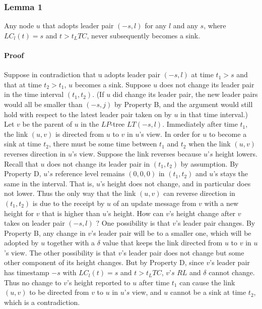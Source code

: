 \documentclass{article}
\begin{document}
\subsubsection{Lemma 1}
Any node $u$ that adopts leader pair $(−s, l)$ for any $l$ and any $s$, where $LC_l(t) = s$ and $t > t_LTC$, never subsequently becomes a sink.

\paragraph{Proof}
Suppose in contradiction that u adopts leader pair $(−s, l)$ at time $t_1 > s$ and that at time $t_2 > t_1$, $u$ becomes a sink. Suppose $u$ does not change its leader pair in the time interval $(t_1, t_2)$. (If $u$ did change its leader pair, the new leader pairs would all be smaller than $(−s, j)$ by Property B, and the argument would still hold with respect to the latest leader pair taken on by $u$ in that time interval.)
Let $v$ be the parent of $u$ in the $LP$-tree $LT(−s, l)$. Immediately after time $t_1$, the link $(u, v)$ is directed from $u$ to $v$ in $u$’s view. In order for $u$ to become a sink at time $t_2$, there must be some time between $t_1$ and $t_2$ when the link $(u, v)$ reverses direction in $u$’s view. Suppose the link reverses because $u’s$ height lowers. Recall that $u$ does not change its leader pair in $(t_1, t_2)$ by assumption. By Property D, $u’s$ reference level remains $(0, 0, 0)$ in $(t_1, t_2)$ and $u$’s \delta stays the same in the interval. That is, $u$’s height does not change, and in particular does not lower. Thus the only way that the link $(u, v)$ can reverse direction in $(t_1, t_2)$ is due to the receipt by $u$ of an update message from $v$ with a new height for $v$ that is higher than $u$’s height. How can $v$’s height change after $v$ takes on leader pair $(−s, l)$ ? One possibility is that $v$’s leader pair changes. By Property B, any change in $v$’s leader pair will be to a smaller one, which will be adopted by $u$ together with a $\delta $ value that keeps the link directed from $u$ to $v$ in $u$’s view. The other possibility is that $v$’s leader pair does not change but some other component of its height changes. But by Property D, since $v$’s leader pair has timestamp $−s$ with $LC_l (t) = s$ and $t > t_LTC$, $v’s$ $RL$ and $\delta $ cannot change. Thus no change to $v$’s height reported to $u$ after time $t_1$ can cause the link $(u, v)$ to be directed from $v$ to $u$ in $u’s$ view, and $u$ cannot be a sink at time $t_2$, which is a contradiction.
\end{document}
